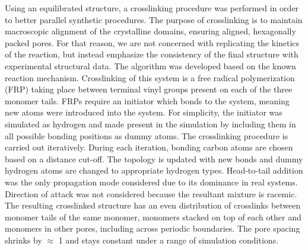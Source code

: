Using an equilibrated structure, a crosslinking procedure was performed
in order to better parallel synthetic procedures. The purpose of 
crosslinking is to maintain macroscopic alignment of the crystalline
domains, ensuring aligned, hexagonally packed pores. For that reason, we
are not concerned with replicating the kinetics of the reaction, but
instead emphasize the consistency of the final structure with experimental
structural data. The algorithm was developed based on the known reaction
mechanism. Crosslinking of this system is a free radical polymerization (FRP)
taking place between terminal vinyl groups present on each of the three
monomer tails. FRPs require an initiator which bonds to the system, 
meaning new atoms were introduced into the system. For simplicity, the 
initiator was simulated as hydrogen and made present in the simulation
by including them in all possible bonding positions as dummy atoms.
The crosslinking procedure is carried out iteratively. During each 
iteration, bonding carbon atoms are chosen based on a distance cut-off.
The topology is updated with new bonds and dummy hydrogen atoms are 
changed to appropriate hydrogen types. Head-to-tail addition was the
only propagation mode considered due to its dominance in real systems.
Direction of attack was not considered because the resultant mixture is
racemic. The resulting crosslinked structure has an even distribution of
crosslinks between monomer tails of the same monomer, monomers stacked on
top of each other and monomers in other pores, including across periodic
boundaries. The pore spacing shrinks by $\approx$ 1 \angstrom and stays 
constant under a range of simulation conditions. 
